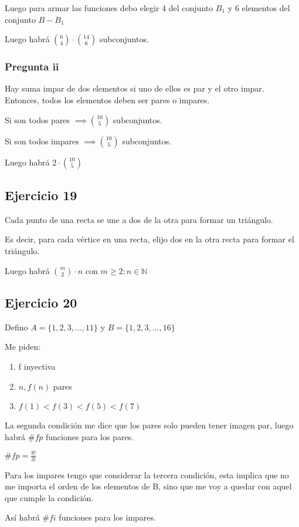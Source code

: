 Luego para armar las funciones debo elegir 4 del conjunto $B_1$ y 6 elementos del conjunto $B - B_1$

Luego habrá $ \binom{6}{4} \cdot \binom{14}{6} $ subconjuntos.

\subsubsection{Pregunta ii}
Hay suma impar de dos elementos si uno de ellos es par y el otro impar. Entonces, todos los elementos deben ser pares o impares.

Si son todos pares $ \implies \binom{10}{5} $ subconjuntos.

Si son todos impares $ \implies \binom{10}{5} $ subconjuntos.

Luego habrá $ 2 \cdot \binom{10}{5} $

\subsection{Ejercicio 19}
Cada punto de una recta se une a dos de la otra para formar un triángulo. 

Es decir, para cada vértice en una recta, elijo dos en la otra recta para formar el triángulo.

Luego habrá $ \binom{m}{2} \cdot n $ con $ m \geq 2; n\in \mathbb{N} $

\subsection{Ejercicio 20}
Defino $ A = \{ 1,2,3,...,11 \} $ y $ B = \{ 1,2,3,...,16 \} $

Me piden:
\begin{enumerate}
    \item f inyectiva
    \item $ n, f(n) $ pares
    \item $ f(1) < f(3) < f(5) < f(7) $
\end{enumerate}

La segunda condición me dice que los pares solo pueden tener imagen par, luego habrá $ \#fp $ funciones para los pares.

$ \#fp = \frac{8!}{3!} $

Para los impares tengo que considerar la tercera condición, esta implica que no me importa el orden de los elementos de B, sino que me voy a quedar con aquel que cumple la condición.

Así habrá $\#fi$ funciones para los impares.

